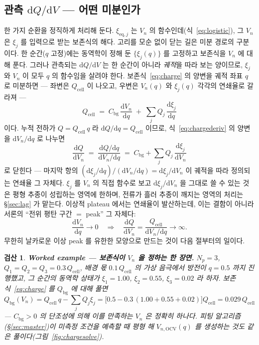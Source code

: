\documentclass[11pt,a4paper]{article}
\newtheorem*{verifybox}{검산}
\newcommand{\dd}{\mathrm{d}}
\newcommand{\eq}{\mathrm{eq}}
\newcommand{\cell}{\mathrm{cell}}
\newcommand{\bg}{\mathrm{bg}}
\newcommand{\OCV}{\mathrm{OCV}}
\begin{document}
\subsection{관측 $\dd Q/\dd V$ — 어떤 미분인가}
한 가지 순환을 정직하게 처리해 둔다. $\xi_{\eq,j}$ 는 $V_n$ 의 함수인데(식~\eqref{eq:logistic}), 그
$V_n$ 은 $\xi_j$ 를 입력으로 받는 보존식의 해다. 고리를 모순 없이 닫는 길은 미분 경로의 구분이다. 한
순간($q$ 고정)에는 동역학이 정해 둔 $\{\xi_j(q)\}$ 를 고정하고 보존식을 $V_n$ 에 대해 푼다. 그러나
관측되는 $\dd Q/\dd V$ 는 한 순간이 아니라 \emph{궤적}을 따라 보는 양이므로, $\xi_j$ 와 $V_n$ 이 모두
$q$ 의 함수임을 살려야 한다. 보존식~\eqref{eq:charge} 의 양변을 궤적 좌표 $q$ 로 미분하면 — 좌변은
$Q_\cell$ 이 나오고, 우변은 $V_n(q)$ 와 $\xi_j(q)$ 각각의 연쇄율로 갈라져 —
\begin{equation}
Q_\cell\;=\;C_\bg\,\frac{\dd V_n}{\dd q}\;+\;\sum_jQ_j\,\frac{\dd\xi_j}{\dd q}
\label{eq:chargederiv}
\end{equation}
이다. 누적 전하가 $Q=Q_\cell\,q$ 라 $\dd Q/\dd q=Q_\cell$ 이므로, 식~\eqref{eq:chargederiv} 의
양변을 $\dd V_n/\dd q$ 로 나누면
\begin{equation}
\frac{\dd Q}{\dd V_n}\;=\;\frac{\dd Q/\dd q}{\dd V_n/\dd q}
\;=\;C_\bg+\sum_jQ_j\,\frac{\dd\xi_j}{\dd V_n}
\label{eq:dQdV}
\end{equation}
로 닫힌다 — 마지막 항의 $(\dd\xi_j/\dd q)/(\dd V_n/\dd q)=\dd\xi_j/\dd V_n$ 이 궤적을 따라
정의되는 연쇄율 그 자체다. $\xi_j$ 를 $V_n$ 의
직접 함수로 보고 $\dd\xi_j/\dd V_n$ 을 그대로 쓸 수 있는 것은 평형 추종이 성립하는 영역에 한하며, 전류가
흘러 추종이 깨지는 영역의 처리는 \S\ref{sec:lag} 가 맡는다. 이상적 plateau 에서는 연쇄율이
발산하는데, 이는 결함이 아니라 서론의 ``전위 평탄 구간 $=$ peak'' 그 자체다:
\begin{equation}
\frac{\dd V_n}{\dd q}\to0
\quad\Longrightarrow\quad
\frac{\dd Q}{\dd V_n}=\frac{Q_\cell}{\dd V_n/\dd q}\to\infty.
\label{eq:plateaudiv}
\end{equation}
무한히 날카로운 이상 peak 를 유한한 모양으로 만드는 것이 다음 절부터의 일이다.

\begin{verifybox}
\textbf{Worked example — 보존식이 $V_n$ 을 정하는 한 장면.} $N_p=3$,
$Q_1=Q_2=Q_3=0.3\,Q_\cell$, 배경 몫 $0.1\,Q_\cell$ 의 가상 음극에서 방전이 $q=0.5$ 까지 진행했고, 그
순간의 동역학 상태가 $\xi_1=1.00$, $\xi_2=0.55$, $\xi_3=0.02$ 라 하자. 보존식~\eqref{eq:charge}
를 $Q_\bg$ 에 대해 풀면
\begin{equation*}
Q_\bg(V_n)=Q_\cell\,q-\sum_jQ_j\xi_j
=\big[0.5-0.3\,(1.00+0.55+0.02)\big]Q_\cell
=0.029\,Q_\cell
\end{equation*}
— $C_\bg>0$ 의 단조성에 의해 이를 만족하는 $V_n$ 은 정확히 하나다.
피팅 알고리즘(\S\ref{sec:master})이 미측정 조건을 예측할 때 평형 해 $V_{n,\OCV}(q)$ 를 생성하는 것도
같은 풀이다(그림~\ref{fig:chargesolve}).
\end{verifybox}
\end{document}
